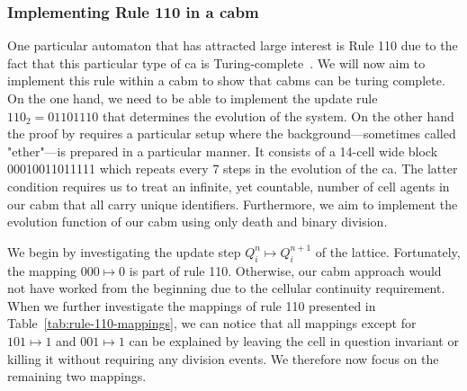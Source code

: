 
\subsubsection{Implementing Rule 110 in a \acl{cabm}}
One particular automaton that has attracted large interest is Rule 110 due to the fact that this
particular type of \ac{ca} is Turing-complete~\cite{Cook2004}.
We will now aim to implement this rule within a \ac{cabm} to show that \acp{cabm} can be turing
complete.
On the one hand, we need to be able to implement the update rule $110_2=01101110$ that determines
the evolution of the system.
On the other hand the proof by \citet{Cook2004} requires a particular setup where the
background---sometimes called "ether"---is prepared in a particular manner.
It consists of a 14-cell wide block 00010011011111 which repeats every 7 steps in the evolution of
the \ac{ca}.
The latter condition requires us to treat an infinite, yet countable, number of cell agents in our
\ac{cabm} that all carry unique identifiers.
Furthermore, we aim to implement the evolution function of our \ac{cabm} using only death and binary
division.

We begin by investigating the update step $Q^n_i\mapsto Q^{n+1}_i$ of the lattice.
Fortunately, the mapping $000\mapsto0$ is part of rule 110.
Otherwise, our \ac{cabm} approach would not have worked from the beginning due to the cellular
continuity requirement.
When we further investigate the mappings of rule 110 presented in Table~\ref{tab:rule-110-mappings},
we can notice that all mappings except for $101\mapsto1$ and $001\mapsto1$ can be explained by
leaving the cell in question invariant or killing it without requiring any division events.
We therefore now focus on the remaining two mappings.

